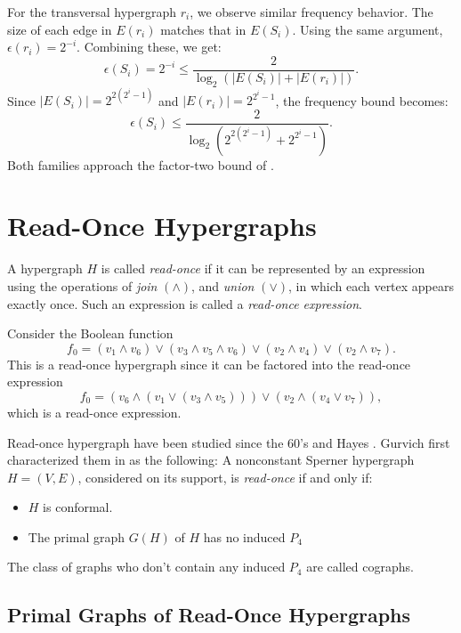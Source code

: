 For the transversal hypergraph $r_i$, we observe similar frequency behavior. The size of each edge in $E(r_i)$ matches that in $E(S_i)$. Using the same argument, $\epsilon(r_i)=2^{-i}$. Combining these, we get:
\[
\epsilon(S_i)=2^{-i}\leq\frac{2}{\log_2(|E(S_i)|+|E(r_i)|)}.
\]
Since $|E(S_i)|=2^{2(2^i-1)}$ and $|E(r_i)|=2^{2^i-1}$, the frequency bound becomes:
\[
\epsilon(S_i)\leq\frac{2}{\log_2(2^{2(2^i-1)}+2^{2^i-1})}.
\]
Both families approach the factor-two bound of \cite{FK96}.

\section{Read-Once Hypergraphs}\label{sec:read-once}

\begin{definition}
A hypergraph $H$ is called \emph{read-once} if it can be represented by an expression using the operations of \emph{join} $(\wedge)$, and \emph{union} $(\vee)$, in which each vertex appears exactly once. Such an expression is called a \emph{read-once expression}.
\end{definition}

\cite{CH11}

\begin{example}
Consider the Boolean function
\[
f_0=(v_1\wedge v_6)\vee(v_3\wedge v_5\wedge v_6)\vee(v_2\wedge v_4)\vee(v_2\wedge v_7).
\]
This is a read-once hypergraph since it can be factored into the read-once expression
\[
f_0=(v_6\wedge(v_1\vee(v_3\wedge v_5)))\vee(v_2\wedge(v_4\vee v_7)),
\]
which is a read-once expression.
\end{example}

Read-once hypergraph have been studied since the 60's \cite{Che67} and Hayes \cite{Hay75}. Gurvich first characterized them in \cite{Gc77} as the following: A nonconstant Sperner hypergraph $H=(V,E)$, considered on its support, is \emph{read-once} if and only if:
\begin{itemize}
\item $H$ is conformal.
\item The primal graph $G(H)$ of $H$ has no induced $P_4$
\end{itemize}
The class of graphs who don't contain any induced $P_4$ are called cographs. \cite{CLB81}

\subsection{Primal Graphs of Read-Once Hypergraphs}

